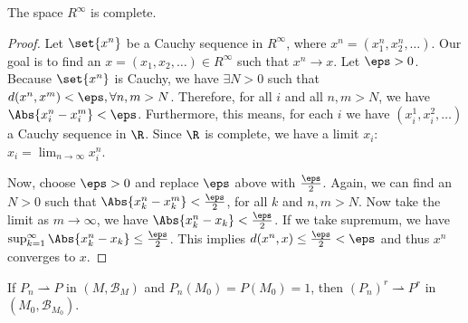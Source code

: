 \documentclass[12pt,letterpaper,twoside]{hmcpset}
\begin{document}
\begin{problem}
  The space $R^\infty$ is complete.
\end{problem}

\begin{solution}
  \begin{proof}
    Let $\set{x^n}$ be a Cauchy sequence in $R^\infty$, where $x^n = (x_1^n, x_2^n, \dotsc)$.
    Our goal is to find an $x = (x_1, x_2, \dotsc) \in R^\infty$ such that $x^n \to x$.
    Let $\eps > 0$.
    Because $\set{x^n}$ is Cauchy, we have $\exists N > 0$ such that $d(x^n,x^m) < \eps, \forall n,m > N$.
    Therefore, for all $i$ and all $n,m > N$, we have $\Abs{x^n_i - x^m_i} < \eps$.
    Furthermore, this means, for each $i$ we have $(x^1_i, x^2_i, \dotsc)$ a Cauchy sequence in $\R$.
    Since $\R$ is complete, we have a limit $x_i$: $x_i = \lim_{n\to\infty}x^n_i$.
    
    Now, choose $\eps > 0$ and replace $\eps$ above with $\frac{\eps}{2}$.
    Again, we can find an $N > 0$ such that $\Abs{x_k^n - x_k^m} < \frac{\eps}{2}$, for all $k$ and $n,m > N$.
    Now take the limit as $m \to \infty$, we have $\Abs{x_k^n - x_k} < \frac{\eps}{2}$.
    If we take supremum, we have $\sup_{k=1}^\infty\Abs{x_k^n - x_k} \leq \frac{\eps}{2}$.
    This implies $d(x^n, x) \leq \frac{\eps}{2} < \eps$ and thus $x^n$ converges to $x$.
    
  \end{proof}
\end{solution}

\begin{problem}
  If $P_n \rightharpoonup P$ in $(M, \mathcal{B}_M)$ and $P_n(M_0) = P(M_0) = 1$, then $(P_n)^r \rightharpoonup P^r$ in $(M_0, \mathcal{B}_{M_0})$.
\end{problem}
\end{document}
